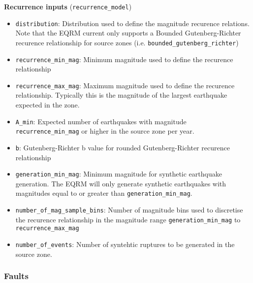 \textbf{Recurrence inputs} (\texttt{recurrence\_model})
\begin{itemize}
\item \texttt{distribution}: Distribution used to define the magnitude recurence relations. Note that
the EQRM current only supports a Bounded Gutenberg-Richter recurence
relationship for source zones (i.e.
\texttt{bounded}\texttt{\_gutenberg}\texttt{\_richter}) \\
\item \texttt{recurrence\_min\_mag}: Minimum magnitude used to
define the recurence relationship \\
\item \texttt{recurrence\_max\_mag}: Maximum magnitude used to
define the recurence relationship. Typically this is the magnitude
of the largest earthquake expected in the zone. \\
\item \texttt{A\_min}: Expected number of earthquakes with magnitude \texttt{recurrence\_min\_mag}
or higher in the source zone per year.
\item \texttt{b}: Gutenberg-Richter b value for rounded Gutenberg-Richter recurence
relationship \\
\item \texttt{generation\_min\_mag}: Minimum magnitude for synthetic
earthquake generation. The EQRM will only generate synthetic
earthquakes with magnitudes equal to or greater than
\texttt{generation\_min\_mag}. \\
\item \texttt{number\_of\_mag\_sample\_bins}: Number of magnitude
bins used to discretise the recurence relationship in the magnitude
range \texttt{generation\_min\_mag} to
\texttt{recurrence\_max\_mag} \\
\item \texttt{number\_of\_events}: Number of syntehtic ruptures to
be generated in the source zone.
\end{itemize}

\subsubsection{Faults}

